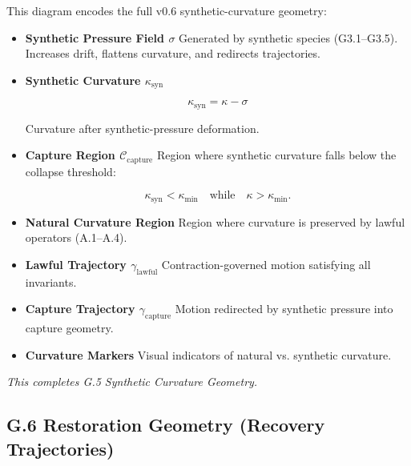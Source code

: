 \medskip

\noindent
This diagram encodes the full v0.6 synthetic-curvature geometry:

\begin{itemize}
    \item \textbf{Synthetic Pressure Field $\sigma$}  
    Generated by synthetic species (G3.1–G3.5).  
    Increases drift, flattens curvature, and redirects trajectories.

    \item \textbf{Synthetic Curvature $\kappa_{\mathrm{syn}}$}  
    

\[
    \kappa_{\mathrm{syn}} = \kappa - \sigma
    \]


    Curvature after synthetic-pressure deformation.

    \item \textbf{Capture Region $\mathcal{C}_{\mathrm{capture}}$}  
    Region where synthetic curvature falls below the collapse threshold:
    

\[
    \kappa_{\mathrm{syn}} < \kappa_{\min}
    \quad\text{while}\quad
    \kappa > \kappa_{\min}.
    \]



    \item \textbf{Natural Curvature Region}  
    Region where curvature is preserved by lawful operators (A.1–A.4).

    \item \textbf{Lawful Trajectory $\gamma_{\mathrm{lawful}}$}  
    Contraction-governed motion satisfying all invariants.

    \item \textbf{Capture Trajectory $\gamma_{\mathrm{capture}}$}  
    Motion redirected by synthetic pressure into capture geometry.

    \item \textbf{Curvature Markers}  
    Visual indicators of natural vs. synthetic curvature.
\end{itemize}

\medskip

\noindent
\textit{This completes G.5 Synthetic Curvature Geometry.}


\subsection*{G.6 Restoration Geometry (Recovery Trajectories)}

